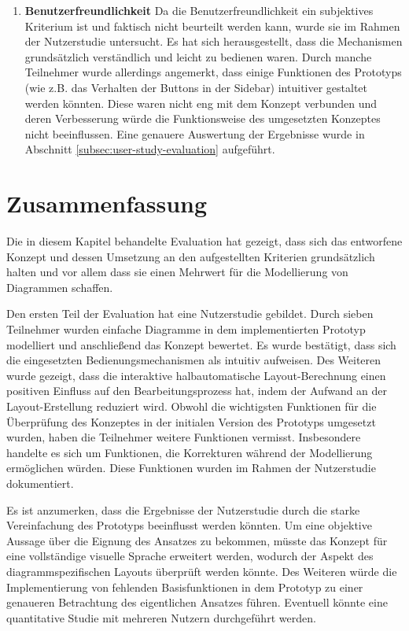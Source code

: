 \begin{enumerate}[label={K.\arabic*}]
\item
\label{eval:user-friendly}
\textbf{Benutzerfreundlichkeit}
Da die Benutzerfreundlichkeit ein subjektives Kriterium ist und faktisch nicht beurteilt werden kann, wurde sie im Rahmen der Nutzerstudie untersucht. Es hat sich herausgestellt, dass die Mechanismen grundsätzlich verständlich und leicht zu bedienen waren. Durch manche Teilnehmer wurde allerdings angemerkt, dass einige Funktionen des Prototyps (wie z.B. das Verhalten der Buttons in der Sidebar) intuitiver gestaltet werden könnten. Diese waren nicht eng mit dem Konzept verbunden und deren Verbesserung würde die Funktionsweise des umgesetzten Konzeptes nicht beeinflussen. Eine genauere Auswertung der Ergebnisse wurde in Abschnitt \ref{subsec:user-study-evaluation} aufgeführt.

\end{enumerate}

\section{Zusammenfassung}
\label{sec:evaluation-summary}

Die in diesem Kapitel behandelte Evaluation hat gezeigt, dass sich das entworfene Konzept und dessen Umsetzung an den aufgestellten Kriterien grundsätzlich halten und vor allem dass sie einen Mehrwert für die Modellierung von Diagrammen schaffen.

Den ersten Teil der Evaluation hat eine Nutzerstudie gebildet. Durch sieben Teilnehmer wurden einfache Diagramme in dem implementierten Prototyp modelliert und anschließend das Konzept bewertet. Es wurde bestätigt, dass sich die eingesetzten Bedienungsmechanismen als intuitiv aufweisen. Des Weiteren wurde gezeigt, dass die interaktive halbautomatische Layout-Berechnung einen positiven Einfluss auf den Bearbeitungsprozess hat, indem der Aufwand an der Layout-Erstellung reduziert wird. Obwohl die wichtigsten Funktionen für die Überprüfung des Konzeptes in der initialen Version des Prototyps umgesetzt wurden, haben die Teilnehmer weitere Funktionen vermisst. Insbesondere handelte es sich um Funktionen, die Korrekturen während der Modellierung ermöglichen würden. Diese Funktionen wurden im Rahmen der Nutzerstudie dokumentiert.

Es ist anzumerken, dass die Ergebnisse der Nutzerstudie durch die starke Vereinfachung des Prototyps beeinflusst werden könnten. Um eine objektive Aussage über die Eignung des Ansatzes zu bekommen, müsste das Konzept für eine vollständige visuelle Sprache erweitert werden, wodurch der Aspekt des diagrammspezifischen Layouts überprüft werden könnte. Des Weiteren würde die Implementierung von fehlenden Basisfunktionen in dem Prototyp zu einer genaueren Betrachtung des eigentlichen Ansatzes führen. Eventuell könnte eine quantitative Studie mit mehreren Nutzern durchgeführt werden.


